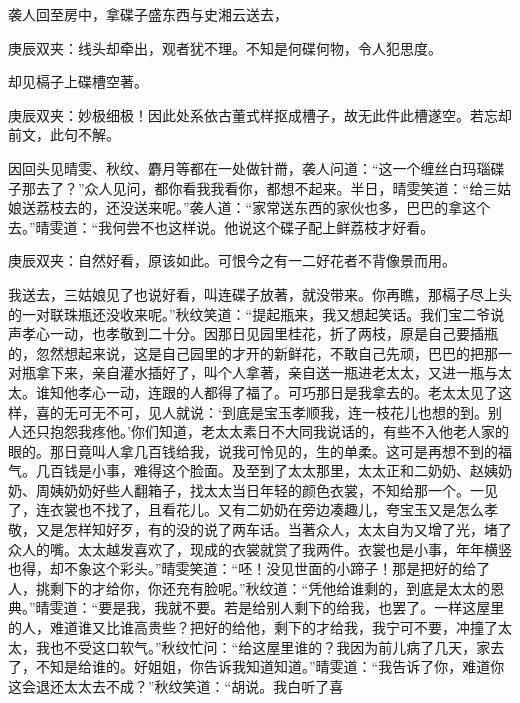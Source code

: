 \begin{parag}
    袭人回至房中，拿碟子盛东西与史湘云送去，\begin{note}庚辰双夹：线头却牵出，观者犹不理。不知是何碟何物，令人犯思度。\end{note}却见槅子上碟槽空著。\begin{note}庚辰双夹：妙极细极！因此处系依古董式样抠成槽子，故无此件此槽遂空。若忘却前文，此句不解。\end{note}因回头见晴雯、秋纹、麝月等都在一处做针黹，袭人问道：“这一个缠丝白玛瑙碟子那去了？”众人见问，都你看我我看你，都想不起来。半日，晴雯笑道：“给三姑娘送荔枝去的，还没送来呢。”袭人道：“家常送东西的家伙也多，巴巴的拿这个去。”晴雯道：“我何尝不也这样说。他说这个碟子配上鲜荔枝才好看。\begin{note}庚辰双夹：自然好看，原该如此。可恨今之有一二好花者不背像景而用。\end{note}我送去，三姑娘见了也说好看，叫连碟子放著，就没带来。你再瞧，那槅子尽上头的一对联珠瓶还没收来呢。”秋纹笑道：“提起瓶来，我又想起笑话。我们宝二爷说声孝心一动，也孝敬到二十分。因那日见园里桂花，折了两枝，原是自己要插瓶的，忽然想起来说，这是自己园里的才开的新鲜花，不敢自己先顽，巴巴的把那一对瓶拿下来，亲自灌水插好了，叫个人拿著，亲自送一瓶进老太太，又进一瓶与太太。谁知他孝心一动，连跟的人都得了福了。可巧那日是我拿去的。老太太见了这样，喜的无可无不可，见人就说：‘到底是宝玉孝顺我，连一枝花儿也想的到。别人还只抱怨我疼他。’你们知道，老太太素日不大同我说话的，有些不入他老人家的眼的。那日竟叫人拿几百钱给我，说我可怜见的，生的单柔。这可是再想不到的福气。几百钱是小事，难得这个脸面。及至到了太太那里，太太正和二奶奶、赵姨奶奶、周姨奶奶好些人翻箱子，找太太当日年轻的颜色衣裳，不知给那一个。一见了，连衣裳也不找了，且看花儿。又有二奶奶在旁边凑趣儿，夸宝玉又是怎么孝敬，又是怎样知好歹，有的没的说了两车话。当著众人，太太自为又增了光，堵了众人的嘴。太太越发喜欢了，现成的衣裳就赏了我两件。衣裳也是小事，年年横竖也得，却不象这个彩头。”晴雯笑道：“呸！没见世面的小蹄子！那是把好的给了人，挑剩下的才给你，你还充有脸呢。”秋纹道：“凭他给谁剩的，到底是太太的恩典。”晴雯道：“要是我，我就不要。若是给别人剩下的给我，也罢了。一样这屋里的人，难道谁又比谁高贵些？把好的给他，剩下的才给我，我宁可不要，冲撞了太太，我也不受这口软气。”秋纹忙问：“给这屋里谁的？我因为前儿病了几天，家去了，不知是给谁的。好姐姐，你告诉我知道知道。”晴雯道：“我告诉了你，难道你这会退还太太去不成？”秋纹笑道：“胡说。我白听了喜
\end{parag}
